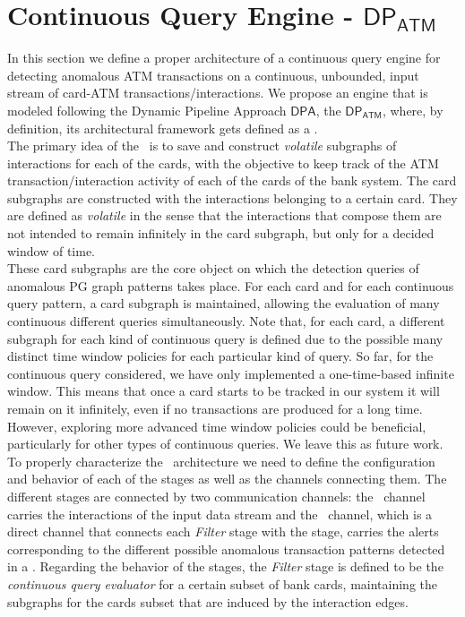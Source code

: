 \newpage
\section{Continuous Query Engine - $\mathsf{DP_{ATM}}$}
\label{sec:CQE-DPATM}

In this section we define a proper architecture of a continuous query engine for detecting anomalous ATM transactions on a continuous, unbounded, input stream of card-ATM transactions/interactions. We propose an engine that is modeled following the Dynamic Pipeline Approach $\mathsf{DPA}$, the $\mathsf{DP_{ATM}}$, where, by definition, its architectural framework gets defined as a \DP.\\ 

The primary idea of the \DPATM\ is to save and construct \emph{volatile} subgraphs of interactions for each of the cards, with the objective to keep track of the ATM transaction/interaction activity of each of the cards of the bank system. The card subgraphs are constructed with the interactions belonging to a certain card. They are defined as \emph{volatile} in the sense that the interactions that compose them are not intended to remain infinitely in the card subgraph, but only for a decided window of time.\\

These card subgraphs are the core object on which the detection queries of anomalous PG graph patterns takes place. For each card and for each continuous query pattern, a card subgraph is maintained, allowing the evaluation of many continuous different queries simultaneously. Note that, for each card, a different subgraph for each kind of continuous query is defined due to the possible many distinct time window policies for each particular kind of query. So far, for the continuous query considered, we have only implemented a one-time-based infinite window. This means that once a card starts to be tracked in our system it will remain on it infinitely, even if no transactions are produced for a long time. However, exploring more advanced time window policies could be beneficial, particularly for other types of continuous queries. We leave this as future work.\\

To properly characterize the \DP\ architecture we need to define the configuration and behavior of each of the stages as well as the channels connecting them. The different stages are connected by two communication channels: the \eventch\ channel carries the interactions of the input data stream and the \alertch\ channel, which is a direct channel that connects each \emph{Filter} stage with the \sink stage, carries the alerts corresponding to the different possible anomalous transaction patterns detected in a \filter. Regarding the behavior of the stages, the \emph{Filter} stage is defined to be the \textit{continuous query evaluator} for a certain subset of bank cards, maintaining the subgraphs for the cards subset that are induced by the interaction edges.\\


